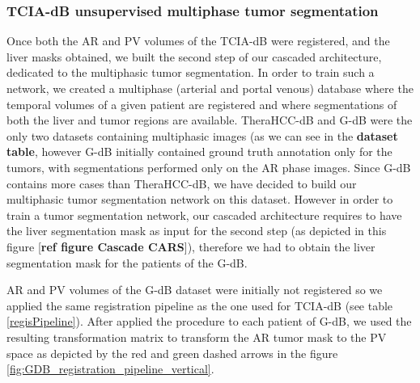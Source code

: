 \documentclass[]{article}
\newcommand{\lmttfont}[1]{{\fontfamily{lmtt}\selectfont #1}}
\begin{document}
\subsubsection{TCIA-dB unsupervised multiphase tumor
segmentation}\label{tcia-db-unsupervised-multiphase-tumor-segmentation}

Once both the AR and PV volumes of the TCIA-dB were registered, and the
liver masks obtained, we built the second step of our cascaded
architecture, dedicated to the multiphasic tumor segmentation. In order
to train such a network, we created a multiphase (arterial and portal
venous) database where the temporal volumes of a given patient are
registered and where segmentations of both the liver and tumor regions
are available.
\lmttfont{TheraHCC-dB} and \lmttfont{G-dB} were the only two datasets containing multiphasic
images (as we can see in the \textbf{dataset table}, however
\lmttfont{G-dB} initially contained ground truth annotation only for the tumors,
with segmentations performed only on the AR phase images.
Since \lmttfont{G-dB} contains more cases than \lmttfont{TheraHCC-dB}, we have decided to
build our multiphasic tumor segmentation network on this dataset.
However in order to train a tumor segmentation network, our cascaded
architecture requires to have the liver segmentation mask as input for
the second step (as depicted in this figure {[}\textbf{ref figure
Cascade CARS}{]}), therefore we had to obtain the liver segmentation
mask for the patients of the G-dB.

AR and PV volumes of the \lmttfont{G-dB} dataset were initially not registered so
we applied the same registration pipeline as the one used for \lmttfont{TCIA-dB} (see table \ref{regisPipeline}). After applied the procedure to
each patient of \lmttfont{G-dB}, we used the resulting transformation matrix to
transform the AR tumor mask to the PV space as depicted by the red and green dashed arrows in the figure \ref{fig:GDB_registration_pipeline_vertical}.
\end{document}

